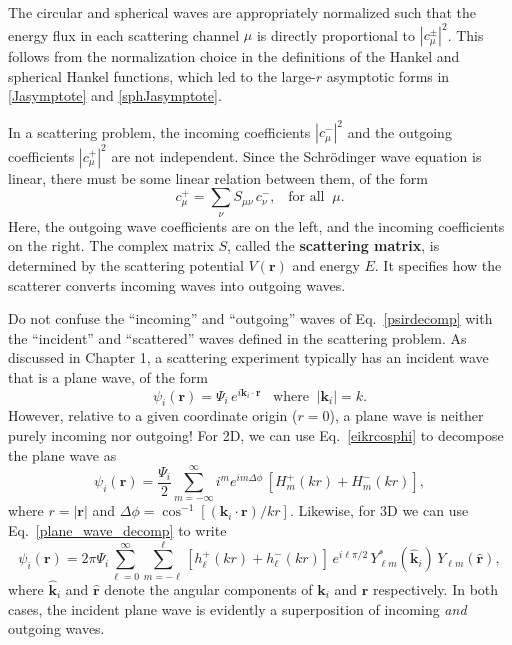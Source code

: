 \documentclass[pra,12pt]{revtex4-2}
\begin{document}
The circular and spherical waves are appropriately normalized such
that the energy flux in each scattering channel $\mu$ is directly
proportional to $|c_\mu^\pm|^2$.  This follows from the normalization
choice in the definitions of the Hankel and spherical Hankel
functions, which led to the large-$r$ asymptotic forms in
\eqref{Jasymptote} and \eqref{sphJasymptote}.

In a scattering problem, the incoming coefficients $|c_\mu^-|^2$ and
the outgoing coefficients $|c_\mu^+|^2$ are not independent.  Since
the Schr\"odinger wave equation is linear, there must be some linear
relation between them, of the form
\begin{equation}
  c_{\mu}^+ = \sum_{\nu} S_{\mu \nu} \, c_{\nu}^-, \;\;\;\text{for all}\;\;\mu.
  \label{srelation}
\end{equation}
Here, the outgoing wave coefficients are on the left, and the incoming
coefficients on the right.  The complex matrix $S$, called the
\textbf{scattering matrix}, is determined by the scattering potential
$V(\mathbf{r})$ and energy $E$.  It specifies how the scatterer
converts incoming waves into outgoing waves.

Do not confuse the ``incoming'' and ``outgoing'' waves of
Eq.~\eqref{psirdecomp} with the ``incident'' and ``scattered'' waves
defined in the scattering problem.  As discussed in Chapter 1, a
scattering experiment typically has an incident wave that is a plane
wave, of the form
\begin{equation}
  \psi_i(\mathbf{r}) = \Psi_i \, e^{i\mathbf{k}_i\cdot\mathbf{r}} \;\;\;
  \mathrm{where}\;\; |\mathbf{k}_i| = k.
\end{equation}
However, relative to a given coordinate origin ($r = 0$), a plane wave
is neither purely incoming nor outgoing!  For 2D, we can use
Eq.~\eqref{eikrcosphi} to decompose the plane wave as
\begin{equation}
  \psi_i(\mathbf{r})
  = \frac{\Psi_i}{2} \sum_{m=-\infty}^\infty i^m e^{im \Delta\phi} \,
  \left[H_m^+(kr) + H_m^-(kr)\right],
  \label{psii_2d}
\end{equation}
where $r = |\mathbf{r}|$ and $\Delta \phi =
\cos^{-1}\left[(\mathbf{k}_i\!\cdot\!\mathbf{r})/kr\right]$.
Likewise, for 3D we can use Eq.~\eqref{plane_wave_decomp} to write
\begin{equation}
  \psi_i(\mathbf{r})
  = 2\pi \Psi_i \sum_{\ell=0}^\infty \sum_{m=-\ell}^\ell
  \left[h_{\ell}^+(kr) + h_{\ell}^-(kr) \right] \, e^{i\ell\pi/2} \,
  Y_{\ell m}^*(\hat{\mathbf{k}}_i) \, Y_{\ell m}(\hat{\mathbf{r}}),
  \label{psii_3d}
\end{equation}
where $\hat{\mathbf{k}}_i$ and $\hat{\mathbf{r}}$ denote the angular
components of $\mathbf{k}_i$ and $\mathbf{r}$ respectively.  In both
cases, the incident plane wave is evidently a superposition of
incoming \textit{and} outgoing waves.
\end{document}
